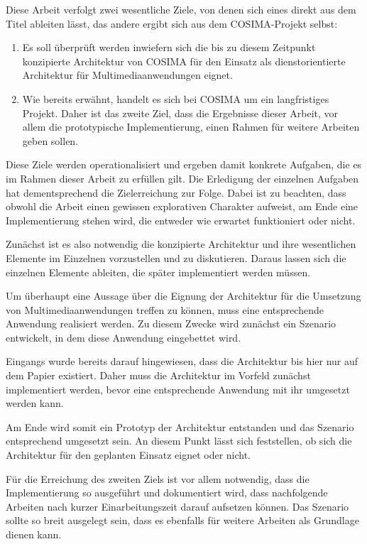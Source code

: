   Diese Arbeit verfolgt zwei wesentliche Ziele, von denen sich eines direkt aus dem Titel ableiten lässt, das andere ergibt sich aus dem COSIMA-Projekt selbst:

  \begin{enumerate}
    \item Es soll überprüft werden inwiefern sich die bis zu diesem Zeitpunkt konzipierte Architektur von COSIMA für den Einsatz als dienstorientierte Architektur für Multimediaanwendungen eignet. 
    \item Wie bereits erwähnt, handelt es sich bei COSIMA um ein langfristiges Projekt. Daher ist das zweite Ziel, dass die Ergebnisse dieser Arbeit, vor allem die prototypische Implementierung, einen Rahmen für weitere Arbeiten geben sollen.
  \end{enumerate}
  
  Diese Ziele werden operationalisiert und ergeben damit konkrete Aufgaben, die es im Rahmen dieser Arbeit zu erfüllen gilt. Die Erledigung der einzelnen Aufgaben hat dementsprechend die Zielerreichung zur Folge. Dabei ist zu beachten, dass obwohl die Arbeit einen gewissen explorativen Charakter aufweist, am Ende eine Implementierung stehen wird, die entweder wie erwartet funktioniert oder nicht.
  
  Zunächst ist es also notwendig die konzipierte Architektur und ihre wesentlichen Elemente im Einzelnen vorzustellen und zu diskutieren. Daraus lassen sich die einzelnen Elemente ableiten, die später implementiert werden müssen.
  
  Um überhaupt eine Aussage über die Eignung der Architektur für die Umsetzung von Multimediaanwendungen treffen zu können, muss eine entsprechende Anwendung realisiert werden. Zu diesem Zwecke wird zunächst ein Szenario entwickelt, in dem diese Anwendung eingebettet wird.
  
  Eingangs wurde bereits darauf hingewiesen, dass die Architektur bis hier nur auf dem Papier existiert. Daher muss die Architektur im Vorfeld zunächst implementiert werden, bevor eine entsprechende Anwendung mit ihr umgesetzt werden kann.
  
  Am Ende wird somit ein Prototyp der Architektur entstanden und das Szenario entsprechend umgesetzt sein. An diesem Punkt lässt sich feststellen, ob sich die Architektur für den geplanten Einsatz eignet oder nicht.
  
  Für die Erreichung des zweiten Ziels ist vor allem notwendig, dass die Implementierung so ausgeführt und dokumentiert wird, dass nachfolgende Arbeiten nach kurzer Einarbeitungszeit darauf aufsetzen können. Das Szenario sollte so breit ausgelegt sein, dass es ebenfalls für weitere Arbeiten als Grundlage dienen kann.
  
